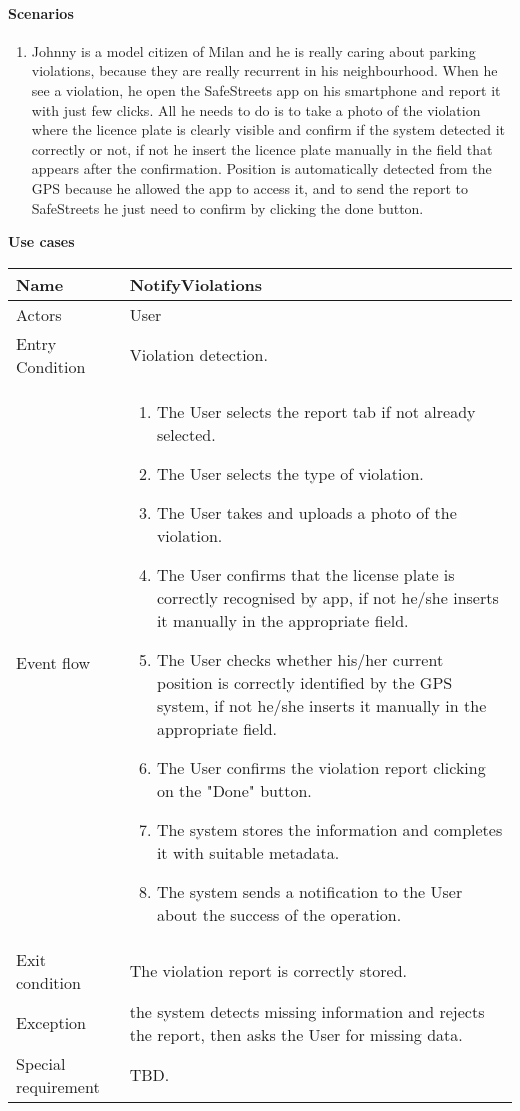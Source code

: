 \paragraph{Scenarios}
    \begin{enumerate}
        \item Johnny is a model citizen of Milan and he is really caring about parking violations, because they are really recurrent in his neighbourhood. When he see a violation, he open the SafeStreets app on his smartphone and report it with just few clicks. All he needs to do is to take a photo of the violation where the licence plate is clearly visible and confirm if the system detected it correctly or not, if not he insert the licence plate manually in the field that appears after the confirmation. Position is automatically detected from the GPS because he allowed the app to access it, and to send the report to SafeStreets he just need to confirm by clicking the done button.
    \end{enumerate}

\textbf{Use cases}\\
\vskip 0.2in

\begin{tabular}{|p{3.7cm}|p{11cm}|}
\hline
Name & NotifyViolations\\
\hline
Actors & User\\
\hline
Entry Condition & Violation detection.\\
\hline
Event flow & \begin{enumerate}
                \item The User selects the report tab if not already selected.
                \item The User selects the type of violation.
                \item The User takes and uploads a photo of the violation.
                \item The User confirms that the license plate is correctly recognised by app, if not he/she inserts it manually in the appropriate field.
                \item The User checks whether his/her current position is correctly identified by the GPS system, if not he/she inserts it manually in the appropriate field.
                \item The User confirms the violation report clicking on the "Done" button.
                \item The system stores the information and completes it with suitable metadata.
                \item The system sends a notification to the User about the success of the operation.
            \end{enumerate}\\
\hline
Exit condition & The violation report is correctly stored.\\
\hline
Exception & the system detects missing information and rejects the report, then asks the User for missing data.\\
\hline
Special requirement & TBD.\\
\hline
\end{tabular}

